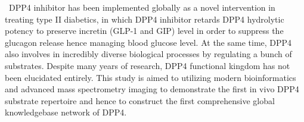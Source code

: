 \ DPP4 inhibitor has been implemented globally as a novel intervention in treating type II diabetics, in which DPP4 inhibitor retards DPP4 hydrolytic potency to preserve incretin (GLP-1 and GIP) level in order to suppress the glucagon release hence managing blood glucose level. At the same time, DPP4 also involves in incredibly diverse biological processes by regulating a bunch of substrates. Despite many years of research, DPP4 functional kingdom has not been elucidated entirely. This study is aimed to utilizing modern bioinformatics and advanced mass spectrometry imaging to demonstrate the first in vivo  DPP4 substrate repertoire and hence to construct the first comprehensive global knowledgebase network of DPP4.